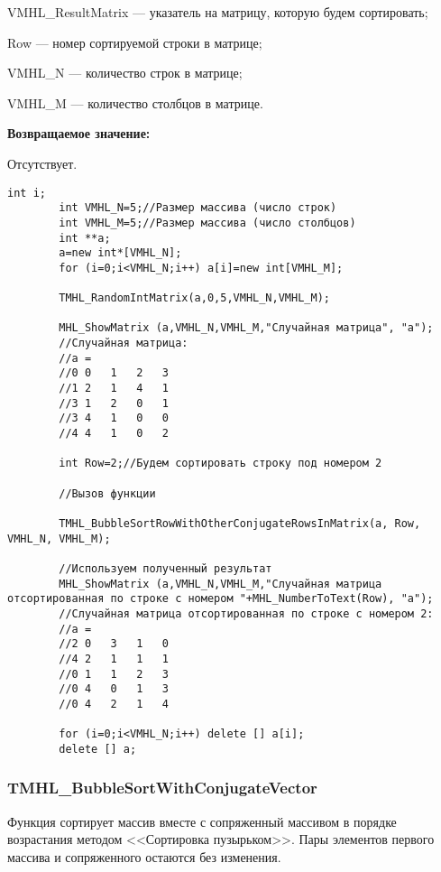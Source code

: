 \documentclass[a4paper,12pt]{article}
\begin{document}
VMHL\_ResultMatrix --- указатель на матрицу, которую будем сортировать;
 
Row --- номер сортируемой строки в матрице;
 
VMHL\_N --- количество строк в матрице;
 
VMHL\_M --- количество столбцов в матрице.

\textbf{Возвращаемое значение:}

Отсутствует.


\begin{lstlisting}[label=code_use_TMHL_BubbleSortRowWithOtherConjugateRowsInMatrix,caption=Пример использования]
        int i;
        int VMHL_N=5;//Размер массива (число строк)
        int VMHL_M=5;//Размер массива (число столбцов)
        int **a;
        a=new int*[VMHL_N];
        for (i=0;i<VMHL_N;i++) a[i]=new int[VMHL_M];

        TMHL_RandomIntMatrix(a,0,5,VMHL_N,VMHL_M);

        MHL_ShowMatrix (a,VMHL_N,VMHL_M,"Случайная матрица", "a");
        //Случайная матрица:
        //a =
        //0	0	1	2	3
        //1	2	1	4	1
        //3	1	2	0	1
        //3	4	1	0	0
        //4	4	1	0	2

        int Row=2;//Будем сортировать строку под номером 2

        //Вызов функции

        TMHL_BubbleSortRowWithOtherConjugateRowsInMatrix(a, Row, VMHL_N, VMHL_M);

        //Используем полученный результат
        MHL_ShowMatrix (a,VMHL_N,VMHL_M,"Случайная матрица отсортированная по строке с номером "+MHL_NumberToText(Row), "a");
        //Случайная матрица отсортированная по строке с номером 2:
        //a =
        //2	0	3	1	0
        //4	2	1	1	1
        //0	1	1	2	3
        //0	4	0	1	3
        //0	4	2	1	4

        for (i=0;i<VMHL_N;i++) delete [] a[i];
        delete [] a;
\end{lstlisting}

\subsubsection{TMHL\_BubbleSortWithConjugateVector}\label{TMHL_BubbleSortWithConjugateVector}

Функция сортирует массив вместе с сопряженный массивом в порядке возрастания методом <<Сортировка пузырьком>>. Пары элементов первого массива и сопряженного остаются без изменения.
\end{document}

